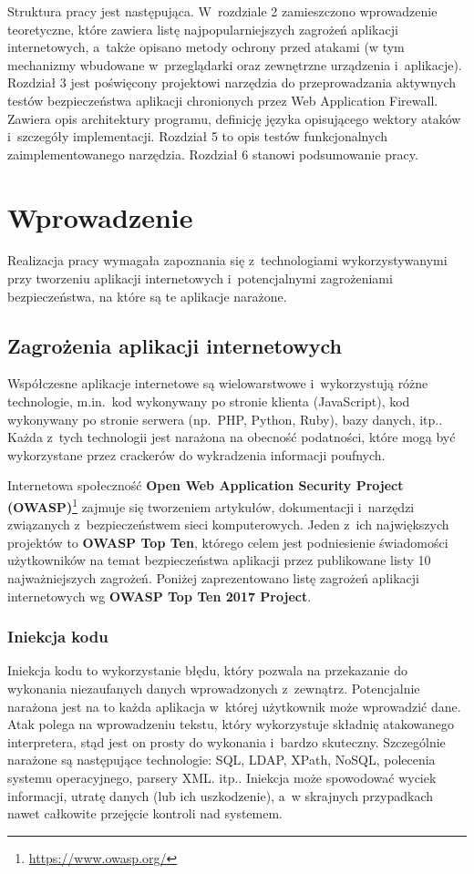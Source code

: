 \documentclass[12pt,a4paper,polish,thesis]{dcsbook}
\begin{document}
Struktura pracy jest następująca. W~rozdziale 2 zamieszczono wprowadzenie teoretyczne, które zawiera listę najpopularniejszych zagrożeń aplikacji internetowych, a~także opisano metody ochrony przed atakami (w tym mechanizmy wbudowane w~przeglądarki oraz zewnętrzne urządzenia i~aplikacje). Rozdział 3 jest poświęcony projektowi narzędzia do przeprowadzania aktywnych testów bezpieczeństwa aplikacji chronionych przez Web Application Firewall. Zawiera opis architektury programu, definicję języka opisującego wektory ataków i~szczegóły implementacji. Rozdział 5 to opis testów funkcjonalnych zaimplementowanego narzędzia. Rozdział 6 stanowi podsumowanie pracy.


\chapter{Wprowadzenie}
Realizacja pracy wymagała zapoznania się z~technologiami wykorzystywanymi przy tworzeniu aplikacji internetowych i~potencjalnymi zagrożeniami bezpieczeństwa, na które są te aplikacje narażone.
\section{Zagrożenia aplikacji internetowych}
Współczesne aplikacje internetowe są wielowarstwowe i~wykorzystują różne technologie, m.in.~kod wykonywany po stronie klienta (JavaScript), kod wykonywany po stronie serwera (np.~PHP, Python, Ruby), bazy danych, itp.. Każda z~tych technologii jest narażona na obecność podatności, które mogą być wykorzystane przez crackerów do wykradzenia informacji poufnych.

Internetowa społeczność \textbf{Open Web Application Security Project (OWASP)}\footnote{\url{ https://www.owasp.org/}} zajmuje się tworzeniem artykułów, dokumentacji i~narzędzi związanych z~bezpieczeństwem sieci komputerowych. Jeden z~ich największych projektów to \textbf{OWASP Top Ten}, którego celem jest podniesienie świadomości użytkowników na temat bezpieczeństwa aplikacji przez publikowane listy 10 najważniejszych zagrożeń. Poniżej zaprezentowano listę zagrożeń aplikacji internetowych wg \textbf{OWASP Top Ten 2017 Project}.

\subsection{Iniekcja kodu}
Iniekcja kodu to wykorzystanie błędu, który pozwala na przekazanie do wykonania niezaufanych danych wprowadzonych z~zewnątrz. Potencjalnie narażona jest na to każda aplikacja w~której użytkownik może wprowadzić dane. Atak polega na wprowadzeniu tekstu, który wykorzystuje składnię atakowanego interpretera, stąd jest on prosty do wykonania i~bardzo skuteczny. Szczególnie narażone są następujące technologie: SQL, LDAP, XPath, NoSQL, polecenia systemu operacyjnego, parsery XML. itp.. Iniekcja może spowodować wyciek informacji, utratę danych (lub ich uszkodzenie), a~w skrajnych przypadkach nawet całkowite przejęcie kontroli nad systemem.
\end{document}
